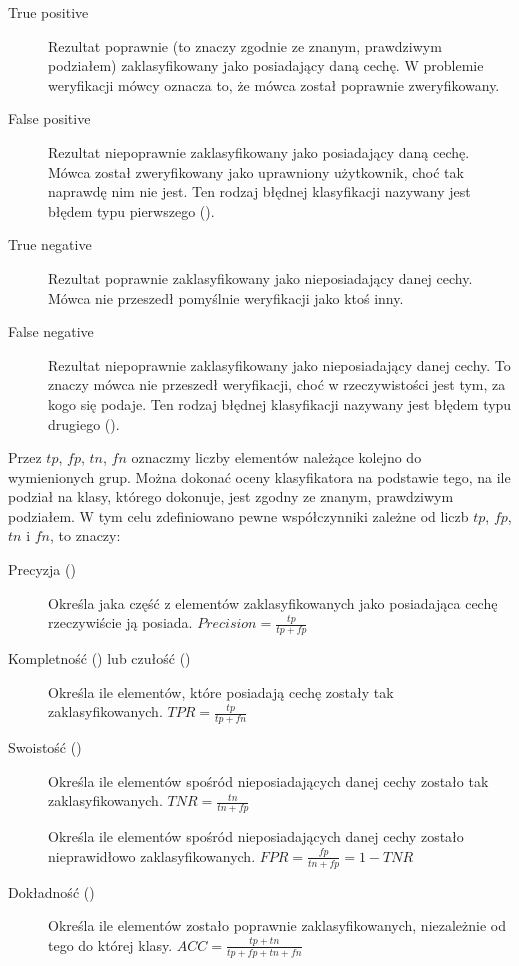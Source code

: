 \begin{description}
    \item[True positive] Rezultat poprawnie (to znaczy zgodnie ze znanym, prawdziwym podziałem) zaklasyfikowany
        jako posiadający daną cechę. W problemie weryfikacji mówcy oznacza to, że mówca został poprawnie zweryfikowany.
    \item[False positive] Rezultat niepoprawnie zaklasyfikowany jako posiadający daną cechę. Mówca został zweryfikowany
        jako uprawniony użytkownik, choć tak naprawdę nim nie jest. Ten rodzaj błędnej klasyfikacji nazywany jest
        błędem typu pierwszego ().
    \item[True negative] Rezultat poprawnie zaklasyfikowany jako nieposiadający danej cechy. Mówca nie przeszedł pomyślnie
        weryfikacji jako ktoś inny.
    \item[False negative] Rezultat niepoprawnie zaklasyfikowany jako nieposiadający danej cechy. To znaczy mówca nie
        przeszedł weryfikacji, choć w rzeczywistości jest tym, za kogo się podaje. Ten rodzaj błędnej klasyfikacji nazywany 
        jest błędem typu drugiego ().
\end{description}

Przez $tp$, $fp$, $tn$, $fn$ oznaczmy liczby elementów należące kolejno do wymienionych grup.
Można dokonać oceny klasyfikatora na podstawie tego, na ile podział na klasy, którego dokonuje,
jest zgodny ze znanym, prawdziwym podziałem. W tym celu zdefiniowano pewne współczynniki zależne
od liczb $tp$, $fp$, $tn$ i $fn$, to znaczy:

\begin{description}
    \item[Precyzja ()] Określa jaka część z elementów zaklasyfikowanych jako posiadająca cechę rzeczywiście ją posiada. $\mathit{Precision} = \frac{tp}{tp + fp}$
    \item[Kompletność () lub czułość ()]
        Określa ile elementów, które posiadają cechę zostały tak zaklasyfikowanych. $\mathit{TPR} = \frac{tp}{tp + fn}$
    \item[Swoistość ()] Określa ile elementów spośród
        nieposiadających danej cechy zostało tak zaklasyfikowanych. $\mathit{TNR} = \frac{tn}{tn + fp}$
    \item[] Określa ile elementów spośród
        nieposiadających danej cechy zostało nieprawidłowo zaklasyfikowanych. $\mathit{FPR} = \frac{fp}{tn + fp} = 1 - \mathit{TNR}$
    \item[Dokładność ()] Określa ile elementów zostało poprawnie zaklasyfikowanych,
        niezależnie od tego do której klasy. $\mathit{ACC} = \frac{tp + tn}{tp + fp + tn + fn}$
\end{description}


